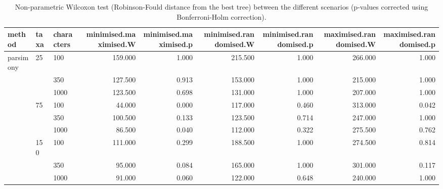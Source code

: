 \begin{table}[ht]
\centering
\begin{tabular}{lllrrrrrr}
  \hline
method & taxa & characters & minimised.maximised.W & minimised.maximised.p & minimised.randomised.W & minimised.randomised.p & maximised.randomised.W & maximised.randomised.p \\ 
  \hline
parsimony & 25 & 100 & 159.000 & 1.000 & 215.500 & 1.000 & 266.000 & 1.000 \\ 
   &  & 350 & 127.500 & 0.913 & 153.000 & 1.000 & 215.000 & 1.000 \\ 
   &  & 1000 & 123.500 & 0.698 & 131.000 & 1.000 & 207.000 & 1.000 \\ 
   & 75 & 100 & 44.000 & 0.000 & 117.000 & 0.460 & 313.000 & 0.042 \\ 
   &  & 350 & 100.500 & 0.133 & 123.500 & 0.714 & 247.000 & 1.000 \\ 
   &  & 1000 & 86.500 & 0.040 & 112.000 & 0.322 & 275.500 & 0.762 \\ 
   & 150 & 100 & 111.000 & 0.299 & 188.500 & 1.000 & 274.500 & 0.814 \\ 
   &  & 350 & 95.000 & 0.084 & 165.000 & 1.000 & 301.000 & 0.117 \\ 
   &  & 1000 & 91.000 & 0.060 & 122.000 & 0.648 & 240.000 & 1.000 \\ 
   \hline
\end{tabular}
\caption{Non-parametric Wilcoxon test (Robinson-Fould distance from the best tree) between the different scenarios (p-values corrected using Bonferroni-Holm correction).} 
\label{Full_Tab_Parsimony_WXRFbest}
\end{table}

